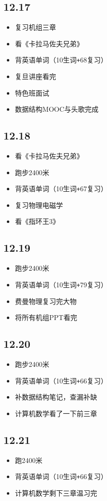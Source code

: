 \documentclass[UTF8]{ctexart}
\begin{document}
\subsection*{12.17}
\begin{itemize}
    \item 复习机组三章
    \item 看《卡拉马佐夫兄弟》
    \item 背英语单词（10生词\verb|+|68复习）
    \item 复旦讲座看完
    \item 特色班面试
    \item 数据结构MOOC与头歌完成
\end{itemize}
\subsection*{12.18}
\begin{itemize}
    \item 看《卡拉马佐夫兄弟》
    \item 跑步2400米
    \item 背英语单词（10生词\verb|+|67复习）
    \item 复习物理电磁学
    \item 看《指环王3》
\end{itemize}
\subsection*{12.19}
\begin{itemize}
    \item 跑步2400米
    \item 背英语单词（10生词\verb|+|79复习）
    \item 费曼物理复习完大物
    \item 将所有机组PPT看完
\end{itemize}
\subsection*{12.20}
\begin{itemize}
    \item 跑步2400米
    \item 背英语单词（10生词\verb|+|66复习）
    \item 补数据结构笔记，查漏补缺
    \item 计算机数学看了一下前三章
\end{itemize}
\subsection*{12.21}
\begin{itemize}
    \item 跑2400米
    \item 背英语单词（10生词\verb|+|66复习）
    \item 计算机数学剩下三章温习完
\end{itemize}
\end{document}
